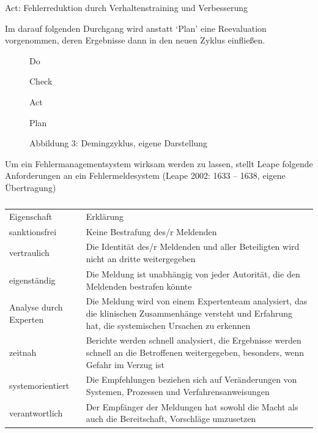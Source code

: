 Act: Fehlerreduktion durch Verhaltenstraining und
Verbesserung

Im darauf folgenden Durchgang wird anstatt \enquote*{Plan} eine
Reevaluation vorgenommen, deren Ergebnisse dann in den
neuen Zyklus einfließen.







\begin{figure}


Do

Check

Act


Plan

\caption{Abbildung 3: Demingzyklus, eigene Darstellung}
\end{figure}
























Um ein Fehlermanagementsystem wirksam werden zu lassen,
stellt Leape folgende Anforderungen an ein
Fehlermeldesystem (Leape 2002: 1633 – 1638, eigene
Übertragung) 



\begin{table}
\begin{tabularx}{\linewidth}{XX}
\centering Eigenschaft &
\centering Erklärung
\\
sanktionsfrei &
Keine Bestrafung des/r Meldenden
\\
vertraulich &
Die Identität des/r Meldenden und aller Beteiligten wird
nicht an dritte weitergegeben
\\
eigenständig &
Die Meldung ist unabhängig von jeder Autorität, die den
Meldenden bestrafen könnte
\\
Analyse durch Experten &
Die Meldung wird von einem Expertenteam analysiert, das die
klinischen Zusammenhänge versteht und Erfahrung hat, die
systemischen Ursachen zu erkennen
\\
zeitnah &
Berichte werden schnell analysiert, die Ergebnisse werden
schnell an die Betroffenen weitergegeben, besonders, wenn
Gefahr im Verzug ist
\\
systemorientiert &
Die Empfehlungen beziehen sich auf Veränderungen von
Systemen, Prozessen und Verfahrensanweisungen
\\
verantwortlich &
Der Empfänger der Meldungen hat sowohl die Macht als auch
die Bereitschaft, Vorschläge umzusetzen
\\
\end{tabularx}
\caption{}
\end{table}



